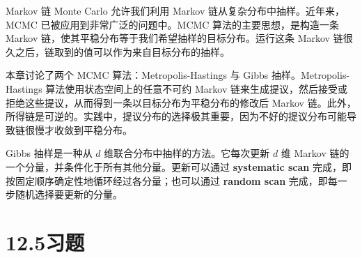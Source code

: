 \documentclass[UTF8,12pt,a4paper,fontset=fandol]{ctexart}
\begin{document}
Markov 链 Monte Carlo 允许我们利用 Markov 链从复杂分布中抽样。近年来，MCMC 已被应用到非常广泛的问题中。MCMC 算法的主要思想，是构造一条 Markov 链，使其平稳分布等于我们希望抽样的目标分布。运行这条 Markov 链很久之后，链取到的值可以作为来自目标分布的抽样。

本章讨论了两个 MCMC 算法：Metropolis-Hastings 与 Gibbs 抽样。Metropolis-Hastings 算法使用状态空间上的任意不可约 Markov 链来生成提议，然后接受或拒绝这些提议，从而得到一条以目标分布为平稳分布的修改后 Markov 链。此外，所得链是可逆的。实践中，提议分布的选择极其重要，因为不好的提议分布可能导致链很慢才收敛到平稳分布。

Gibbs 抽样是一种从 $d$ 维联合分布中抽样的方法。它每次更新 $d$ 维 Markov 链的一个分量，并条件化于所有其他分量。更新可以通过 \textbf{systematic scan} 完成，即按固定顺序确定性地循环经过各分量；也可以通过 \textbf{random scan} 完成，即每一步随机选择要更新的分量。

\section*{12.5\quad 习题}
\end{document}

